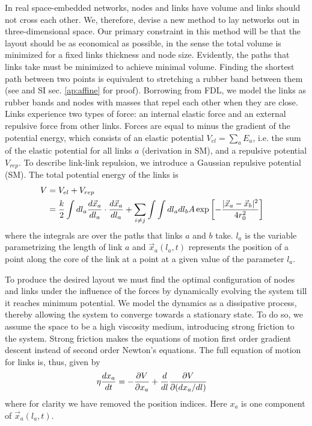 \documentclass[nofootinbib,preprint,floatfix]{revtex4} %
\begin{document}
In real space-embedded networks, nodes and links have volume and links should not cross each other.
We, therefore, devise a new method to lay networks out in three-dimensional space. 
Our primary constraint in this method will be that the layout should be as economical as possible, in the sense the total volume is minimized for a fixed links thickness and node size. 
Evidently, the paths that links take must be minimized to achieve minimal volume. 
Finding the shortest path between two points is equivalent to stretching a rubber band between them (see \cite{novikov1984} and SI sec. \ref{ap:affine} for proof).
Borrowing from FDL, we model the links as rubber bands 
and nodes with masses that repel each other when they are close. 
Links experience two types of force: an internal elastic force and an external repulsive force from other links.     
Forces are equal to minus the gradient of the potential energy,
which consists of an elastic potential $V_{el}= \sum_a E_a$, i.e. the sum of the elastic potential for all links $a$
(derivation in SM),
and a repulsive potential $V_{rep}$. 
To describe link-link repulsion, we introduce a Gaussian repulsive potential (SM). 
The total potential energy of the links is
\begin{align}
    V &= V_{el} + V_{rep} \cr 
    &= {k\over 2}\int dl_a {d\vec{x}_a\over dl_a} \cdot {d\vec{x}_a\over dl_a} + 
    \sum_{i\ne j} \int \int dl_adl_b 
    A \exp\left[- {|\vec{x}_a-\vec{x}_b|^2 \over 4 r_0^2}\right] \label{eq:Vfull}
\end{align}
where the integrals are over the paths that links $a$ and $b$ take. $l_a$ is the variable parametrizing the length of link $a$ and  $\vec{x}_a(l_a,t)$ represents the position of a point along the core of the link at a point at a given value of the parameter $l_a$.  

To produce the desired layout we must find the optimal configuration of nodes and links under the influence of the forces by dynamically evolving the system till it reaches minimum potential. 
We model the dynamics as a dissipative process, thereby allowing the system to converge towards a stationary state. 
To do so, we assume the space to be a high viscosity medium, introducing strong friction to the system.
Strong friction makes the equations of motion first order gradient descent instead of second order Newton's equations.
The full equation of motion for links is, thus, given by 
\begin{align}
    \eta {dx_a \over dt} & =  -{\partial V \over \partial x_a} + {d\over dl} {\partial V \over \partial (dx_a /dl)}   \label{eq:Langevin0}
\end{align}
where for clarity we have removed the position indices. Here $x_a$ is one component of $\vec{x}_a(l_a,t)$. 
\end{document}

